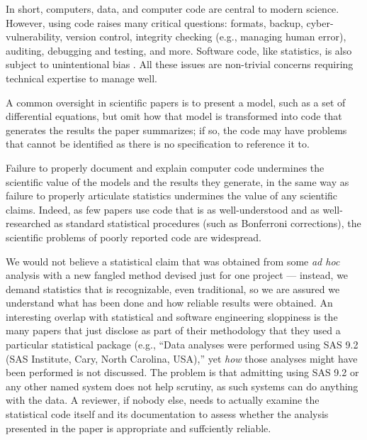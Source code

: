 In short, computers, data, and computer code are central to modern science. However, using code raises many critical questions: formats, backup, cyber-vulnerability, version control, integrity checking (e.g., managing human error), auditing, debugging and testing, and more. Software code, like statistics, is also subject to unintentional bias \cite{Ben,se-bias}.  All these issues are non-trivial concerns requiring technical expertise to manage well. 

A common oversight in scientific papers is to present a model, such as a set of differential equations, but omit how that model is transformed into code that generates the results the paper summarizes; if so, the code may have problems that cannot be identified as there is no specification to reference it to.

Failure to properly document and explain computer code undermines the scientific value of the models and the results they generate, in the same way as failure to properly articulate statistics undermines the value of any scientific claims. Indeed, as few papers use code that is as well-understood and as well-researched as standard statistical procedures (such as Bonferroni corrections), the scientific problems of poorly reported code are widespread. 


We would not believe a statistical claim that was obtained from some \emph{ad hoc\/} analysis with a new fangled method devised just for one project --- instead, we demand statistics that is recognizable, even traditional, so we are assured we understand what has been done and how reliable results were obtained. An interesting overlap with statistical and software engineering sloppiness is the many papers that just disclose as part of their methodology that they used a particular statistical package (e.g., ``Data analyses were performed using SAS 9.2 (SAS Institute, Cary, North Carolina, USA),'' yet \emph{how\/} those analyses might have been performed is not discussed. The problem is that admitting using SAS 9.2 or any other named system does not help scrutiny, as such systems can do anything with the data. A reviewer, if nobody else, needs to actually examine the statistical code itself and its documentation to assess whether the analysis presented in the paper is appropriate and suffciently reliable. 

